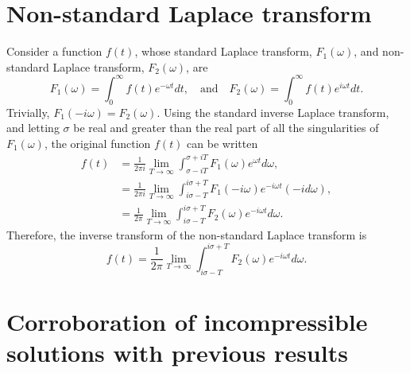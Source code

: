 \documentclass[12pt]{../style-files/ociamthesis}
\begin{document}
\section{Non-standard Laplace transform}\label{app: laplace trans}
Consider a function $f(t)$, whose standard Laplace transform, $F_1(\omega)$, and non-standard Laplace transform, $F_2(\omega)$, are
\begin{equation}
F_1(\omega) = \int_0^\infty f(t) e^{-\omega t} dt,
\quad \text{and} \quad
F_2(\omega) = \int_0^\infty f(t) e^{i\omega t} dt.
\end{equation}
Trivially, $F_1(-i\omega) = F_2(\omega)$. Using the standard inverse Laplace transform, and letting $\sigma$ be real and greater than the real part of all the singularities of $F_1(\omega)$, the original function $f(t)$ can be written
\begin{align}
f(t) & = \frac{1}{2\pi i} \lim_{T\to\infty} \int_{\sigma - iT}^{\sigma + iT} F_1(\omega)e^{\omega t} d\omega, \\
& = \frac{1}{2\pi i} \lim_{T\to\infty} \int_{i\sigma - T}^{i\sigma + T} F_1(-i\omega)e^{-i\omega t} (-id\omega), \\
& = \frac{1}{2\pi} \lim_{T\to\infty} \int_{i\sigma - T}^{i\sigma + T} F_2(\omega)e^{-i\omega t} d\omega.
\end{align}
Therefore, the inverse transform of the non-standard Laplace transform is
\begin{equation}
f(t) = \frac{1}{2\pi} \lim_{T\to\infty} \int_{i\sigma - T}^{i\sigma + T} F_2(\omega)e^{-i\omega t} d\omega.
\end{equation}


\section{Corroboration of incompressible solutions with previous results}
\end{document}
